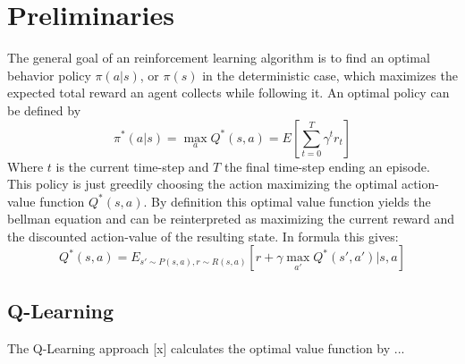 \section{Preliminaries}
The general goal of an reinforcement learning algorithm is to find an optimal behavior policy $\pi(a|s)$, or $\pi(s)$ in the deterministic case, which maximizes the expected total reward an agent collects while following it. An optimal policy can be defined by 
\[ 
\pi^*(a|s)=\max_a Q^*(s,a)=E \left[
\sum_{t=0}^{T}\gamma^{t}r_t\right] 
\]
Where $t$ is the current time-step and $T$ the final time-step ending an episode.
This policy is just greedily choosing the action maximizing the optimal action-value function $Q^*(s,a)$. By definition this optimal value function yields the bellman equation \citep{sutton2018reinforcement} and can be reinterpreted as maximizing the current reward and the discounted action-value of the resulting state. In formula this gives:
\[
Q^*(s,a) = E_{s'\sim P(s,a), r\sim R(s,a)}\left[
r + \gamma \max_{a'}Q^*(s',a')|s,a \right]
\]
\subsection{Q-Learning}
The Q-Learning approach [x] calculates the optimal value function by ...
